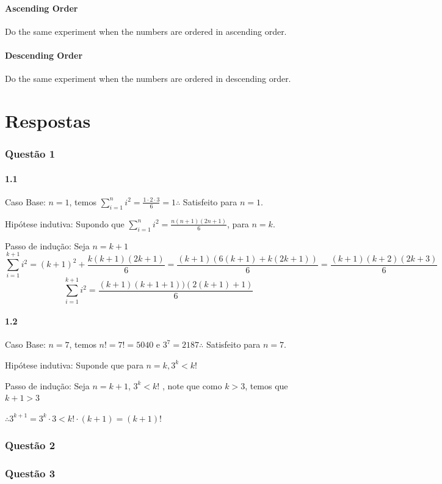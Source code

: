 \documentclass{article}
\begin{document}
\subsection{Ascending Order}
Do the same experiment when the numbers are ordered in ascending order.

\subsection{Descending Order}
Do the same experiment when the numbers are ordered in descending order.


\part*{Respostas}

\section*{Questão 1}
\subsection*{1.1}
Caso Base: $n = 1$, temos $\sum^{n}_{i=1}{i^2}= \frac{1\cdot2\cdot3}{6}=1 \therefore$ Satisfeito para $n = 1$.

Hipótese indutiva: Supondo que $\sum^{n}_{i=1}{i^2} =\frac{n(n+1)(2n+1)}{6}$, para $n = k$.

Passo de indução: Seja $n = k + 1$
$$\sum^{k+1}_{i=1}{i^2} = (k+1)^2 + \frac{k(k+1)(2k+1)}{6} =
\frac{(k+1)(6(k+1) + k(2k + 1))}{6} = \frac{(k+1)(k+2)(2k +3)}{6} 
$$
$$
\sum^{k+1}_{i=1}{i^2} = \frac{(k+1)(k+1+1))(2(k+1)+1)}{6}
$$

\subsection*{1.2}
Caso Base: $n = 7$, temos $n! = 7! = 5040$ e $3^7 = 2187 \therefore$ Satisfeito para $n = 7$.

Hipótese indutiva: Suponde que para $n=k, 3^k < k!$

Passo de indução: Seja $n = k + 1$, $3^k < k!$
, note que como $k>3$, temos que $k+1>3$

$\therefore 3^{k+1}=3^k\cdot3 < k!\cdot(k+1)=(k+1)!$

\section*{Questão 2}
\section*{Questão 3}
\end{document}
